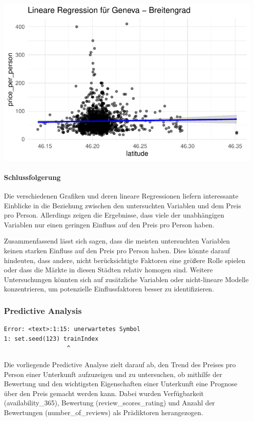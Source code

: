 \documentclass[
  journal,
]{IEEEtran}%
\let\oldparagraph\paragraph
\renewcommand{\paragraph}[1]{\oldparagraph{#1}\mbox{}}
\begin{document}
\includegraphics{main_files/figure-pdf/unnamed-chunk-16-8.pdf}

\hypertarget{schlussfolgerung}{%
\paragraph{Schlussfolgerung}\label{schlussfolgerung}}

Die verschiedenen Grafiken und deren lineare Regressionen liefern
interessante Einblicke in die Beziehung zwischen den untersuchten
Variablen und dem Preis pro Person. Allerdings zeigen die Ergebnisse,
dass viele der unabhängigen Variablen nur einen geringen Einfluss auf
den Preis pro Person haben.

Zusammenfassend lässt sich sagen, dass die meisten untersuchten
Variablen keinen starken Einfluss auf den Preis pro Person haben. Dies
könnte darauf hindeuten, dass andere, nicht berücksichtigte Faktoren
eine größere Rolle spielen oder dass die Märkte in diesen Städten
relativ homogen sind. Weitere Untersuchungen könnten sich auf
zusätzliche Variablen oder nicht-lineare Modelle konzentrieren, um
potenzielle Einflussfaktoren besser zu identifizieren.

\hypertarget{predictive-analysis-1}{%
\subsubsection{Predictive Analysis}\label{predictive-analysis-1}}

\begin{verbatim}
Error: <text>:1:15: unerwartetes Symbol
1: set.seed(123) trainIndex
                  ^
\end{verbatim}

Die vorliegende Predictive Analyse zielt darauf ab, den Trend des
Preises pro Person einer Unterkunft aufzuzeigen und zu untersuchen, ob
mithilfe der Bewertung und den wichtigsten Eigenschaften einer
Unterkunft eine Prognose über den Preis gemacht werden kann. Dabei
wurden Verfügbarkeit (availability\_365), Bewertung
(review\_scores\_rating) und Anzahl der Bewertungen
(number\_of\_reviews) als Prädiktoren herangezogen.
\end{document}
